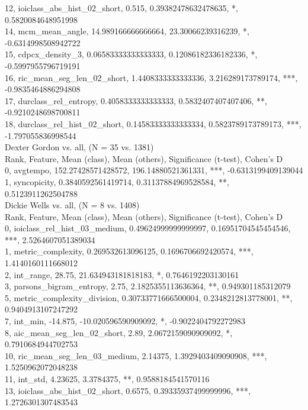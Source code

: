 12, ioiclass_abs_hist_02_short, 0.515, 0.39382478632478635, *, 0.5820084648951998\\
14, mcm_mean_angle, 14.989166666666664, 23.30066239316239, *, -0.6314998508942722\\
15, cdpcx_density_3, 0.06583333333333333, 0.12086182336182336, *, -0.5997955796719191\\
16, ric_mean_seg_len_02_short, 1.4408333333333336, 3.216289173789174, ***, -0.9835464886294808\\
17, durclass_rel_entropy, 0.4058333333333333, 0.5832407407407406, **, -0.9210248698700811\\
18, durclass_rel_hist_02_short, 0.14583333333333334, 0.5823789173789173, ***, -1.797055836998544\\
Dexter Gordon vs. all, (N = 35 vs. 1381)\\
Rank, Feature, Mean (class), Mean (others), Significance (t-test), Cohen's D\\
0, avgtempo, 152.27428571428572, 196.14880521361331, ***, -0.6313199409139044\\
1, syncopicity, 0.3840592561419714, 0.31137884969528584, **, 0.5123911262504788\\
Dickie Wells vs. all, (N = 8 vs. 1408)\\
Rank, Feature, Mean (class), Mean (others), Significance (t-test), Cohen's D\\
0, ioiclass_rel_hist_03_medium, 0.49624999999999997, 0.16951704545454546, ***, 2.5264607051389034\\
1, metric_complexity, 0.269532613096125, 0.1696706692420574, ***, 1.4140160111668012\\
2, int_range, 28.75, 21.634943181818183, *, 0.7646192203130161\\
3, parsons_bigram_entropy, 2.75, 2.1825355113636364, **, 0.949301185312079\\
5, metric_complexity_division, 0.30733771666500004, 0.2348212813778001, **, 0.9404913107247292\\
7, int_min, -14.875, -10.020596590909092, *, -0.9022404792272983\\
8, aic_mean_seg_len_02_short, 2.89, 2.0672159090909092, *, 0.7910684944702753\\
10, ric_mean_seg_len_03_medium, 2.14375, 1.3929403409090908, ***, 1.5250962072048238\\
11, int_std, 4.23625, 3.3784375, **, 0.9588184541570116\\
13, ioiclass_abs_hist_02_short, 0.6575, 0.39335937499999996, ***, 1.2726301307483543\\
